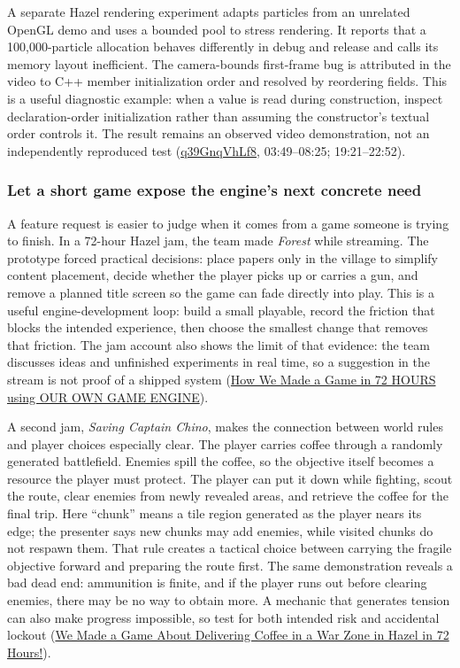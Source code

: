 A separate Hazel rendering experiment adapts particles from an unrelated OpenGL demo and uses a bounded pool to stress rendering. It reports that a 100,000-particle allocation behaves differently in debug and release and calls its memory layout inefficient. The camera-bounds first-frame bug is attributed in the video to C++ member initialization order and resolved by reordering fields. This is a useful diagnostic example: when a value is read during construction, inspect declaration-order initialization rather than assuming the constructor's textual order controls it. The result remains an observed video demonstration, not an independently reproduced test (\href{https://www.youtube.com/watch?v=q39GnqVhLf8}{q39GnqVhLf8}, 03:49--08:25; 19:21--22:52).

\subsubsection{Let a short game expose the engine's next concrete need}\label{05-engine-i-ch013-let-a-short-game-expose-the-engines-next-concrete-need}

\hypertarget{05-engine-i-ch013-let-a-short-game-expose-the-engines-next-concrete-need}{}

A feature request is easier to judge when it comes from a game someone is trying to finish. In a 72-hour Hazel jam, the team made \emph{Forest} while streaming. The prototype forced practical decisions: place papers only in the village to simplify content placement, decide whether the player picks up or carries a gun, and remove a planned title screen so the game can fade directly into play. This is a useful engine-development loop: build a small playable, record the friction that blocks the intended experience, then choose the smallest change that removes that friction. The jam account also shows the limit of that evidence: the team discusses ideas and unfinished experiments in real time, so a suggestion in the stream is not proof of a shipped system (\href{https://www.youtube.com/watch?v=tQ_pjZDfm-0&t=0m1s}{How We Made a Game in 72 HOURS using OUR OWN GAME ENGINE}).

A second jam, \emph{Saving Captain Chino}, makes the connection between world rules and player choices especially clear. The player carries coffee through a randomly generated battlefield. Enemies spill the coffee, so the objective itself becomes a resource the player must protect. The player can put it down while fighting, scout the route, clear enemies from newly revealed areas, and retrieve the coffee for the final trip. Here ``chunk'' means a tile region generated as the player nears its edge; the presenter says new chunks may add enemies, while visited chunks do not respawn them. That rule creates a tactical choice between carrying the fragile objective forward and preparing the route first. The same demonstration reveals a bad dead end: ammunition is finite, and if the player runs out before clearing enemies, there may be no way to obtain more. A mechanic that generates tension can also make progress impossible, so test for both intended risk and accidental lockout (\href{https://www.youtube.com/watch?v=ahrdtYwBLTk&t=6m42s}{We Made a Game About Delivering Coffee in a War Zone in Hazel in 72 Hours!}).

